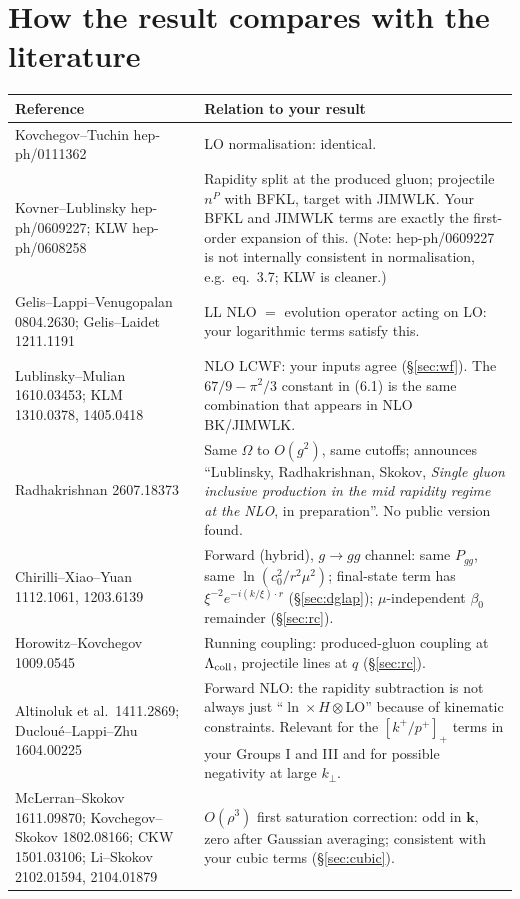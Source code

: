 \documentclass[10pt]{article}
\begin{document}
\section{How the result compares with the literature}
\begin{longtable}{p{4.6cm}p{11cm}}
\toprule
Reference & Relation to your result\\
\midrule
Kovchegov--Tuchin hep-ph/0111362 & LO normalisation: identical.\\
Kovner--Lublinsky hep-ph/0609227; KLW hep-ph/0608258 & Rapidity split at the produced gluon; projectile $n^P$ with BFKL, target with JIMWLK. Your BFKL and JIMWLK terms are exactly the first-order expansion of this. (Note: hep-ph/0609227 is not internally consistent in normalisation, e.g.\ eq.~3.7; KLW is cleaner.)\\
Gelis--Lappi--Venugopalan 0804.2630; Gelis--Laidet 1211.1191 & LL NLO $=$ evolution operator acting on LO: your logarithmic terms satisfy this.\\
Lublinsky--Mulian 1610.03453; KLM 1310.0378, 1405.0418 & NLO LCWF: your inputs agree (\S\ref{sec:wf}). The $67/9-\pi^2/3$ constant in (6.1) is the same combination that appears in NLO BK/JIMWLK.\\
Radhakrishnan 2607.18373 & Same $\Omega$ to $O(g^2)$, same cutoffs; announces ``Lublinsky, Radhakrishnan, Skokov, \emph{Single gluon inclusive production in the mid rapidity regime at the NLO}, in preparation''. No public version found.\\
Chirilli--Xiao--Yuan 1112.1061, 1203.6139 & Forward (hybrid), $g\to gg$ channel: same $P_{gg}$, same $\ln(c_0^2/r^2\mu^2)$; final-state term has $\xi^{-2}e^{-i(k/\xi)\cdot r}$ (\S\ref{sec:dglap}); $\mu$-independent $\beta_0$ remainder (\S\ref{sec:rc}).\\
Horowitz--Kovchegov 1009.0545 & Running coupling: produced-gluon coupling at $\Lambda_{\rm coll}$, projectile lines at $q$ (\S\ref{sec:rc}).\\
Altinoluk et al.\ 1411.2869; Ducloué--Lappi--Zhu 1604.00225 & Forward NLO: the rapidity subtraction is not always just ``$\ln\times H\otimes$LO'' because of kinematic constraints. Relevant for the $[k^+/p^+]_+$ terms in your Groups I and III and for possible negativity at large $k_\perp$.\\
McLerran--Skokov 1611.09870; Kovchegov--Skokov 1802.08166; CKW 1501.03106; Li--Skokov 2102.01594, 2104.01879 & $O(\rho^3)$ first saturation correction: odd in $\mathbf k$, zero after Gaussian averaging; consistent with your cubic terms (\S\ref{sec:cubic}).\\
\bottomrule
\end{longtable}
\end{document}

